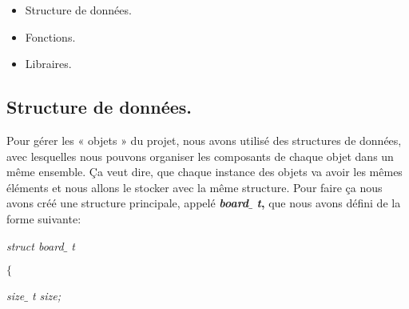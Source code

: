 \documentclass[a4paper,12pt]{article}
\begin{document}
\begin{itemize}
	\item Structure de données.\par

	\item Fonctions.\par

	\item Libraires.
\end{itemize}\par


\vspace{\baselineskip}

\noindent \subsection{Structure de données.}\par


\noindent \begin{justify}
Pour gérer les « objets » du projet, nous avons utilisé des structures de données, avec lesquelles nous pouvons organiser les composants de chaque objet dans un même ensemble. Ça veut dire, que chaque instance des objets va avoir les mêmes éléments et nous allons le stocker avec la même structure. Pour faire ça nous avons créé une structure principale, appelé \textbf{\textit{board$ \_ $ t}, }que nous avons défini de la forme suivante:
\end{justify}\par


\noindent \begin{justify}
\hspace*{0.49in}\hspace*{0.49in}\hspace*{0.49in}\hspace*{0.49in}\textit{struct board$ \_ $ t}
\end{justify}\par


\noindent \begin{justify}
\hspace*{0.49in}\hspace*{0.49in}\hspace*{0.49in}\textit{\hspace*{0.49in}$ \{ $ }
\end{justify}\par


\noindent \begin{justify}
\hspace*{0.49in}\hspace*{0.49in}\hspace*{0.49in}\hspace*{0.49in}\hspace*{0.49in}\textit{size$ \_ $ t size;}
\end{justify}\par
\end{document}

